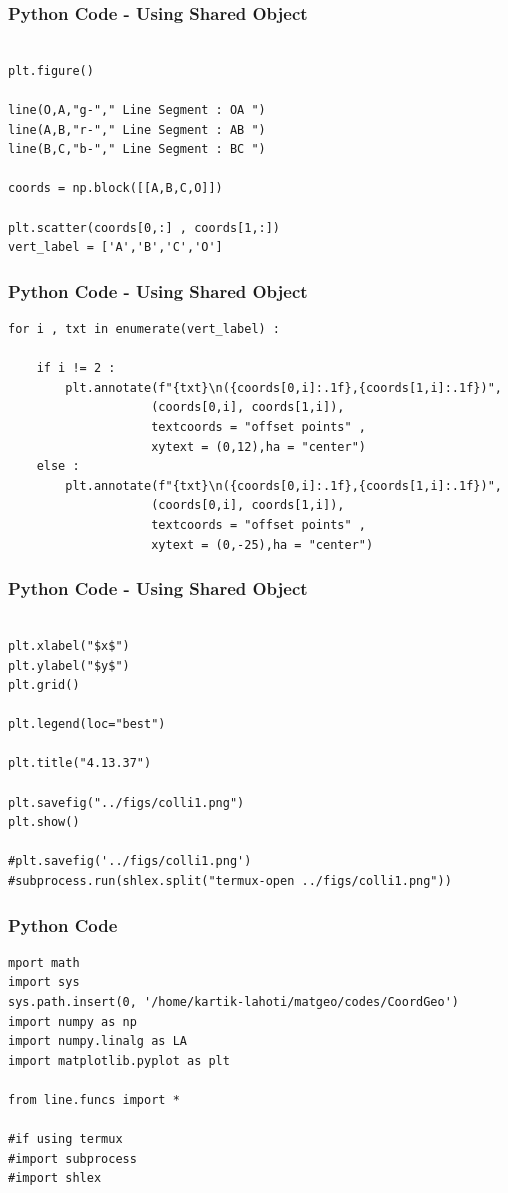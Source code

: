 \documentclass{beamer}
\begin{document}
\begin{frame}[fragile]
    \frametitle{Python Code - Using Shared Object}
    \begin{lstlisting}
    
plt.figure()

line(O,A,"g-"," Line Segment : OA ")
line(A,B,"r-"," Line Segment : AB ")
line(B,C,"b-"," Line Segment : BC ")

coords = np.block([[A,B,C,O]])

plt.scatter(coords[0,:] , coords[1,:])
vert_label = ['A','B','C','O']

\end{lstlisting}
\end{frame}
\begin{frame}[fragile]
    \frametitle{Python Code - Using Shared Object}
    \begin{lstlisting}
for i , txt in enumerate(vert_label) :
    
    if i != 2 :
        plt.annotate(f"{txt}\n({coords[0,i]:.1f},{coords[1,i]:.1f})",
                    (coords[0,i], coords[1,i]),
                    textcoords = "offset points" ,
                    xytext = (0,12),ha = "center")
    else :
        plt.annotate(f"{txt}\n({coords[0,i]:.1f},{coords[1,i]:.1f})",
                    (coords[0,i], coords[1,i]),
                    textcoords = "offset points" ,
                    xytext = (0,-25),ha = "center")
\end{lstlisting}
\end{frame}
\begin{frame}[fragile]
    \frametitle{Python Code - Using Shared Object}
    \begin{lstlisting}
    
plt.xlabel("$x$")
plt.ylabel("$y$")
plt.grid()

plt.legend(loc="best")

plt.title("4.13.37")

plt.savefig("../figs/colli1.png")
plt.show()

#plt.savefig('../figs/colli1.png')
#subprocess.run(shlex.split("termux-open ../figs/colli1.png"))

\end{lstlisting}
\end{frame}

\begin{frame}[fragile]
    \frametitle{Python Code}
    \begin{lstlisting}
mport math
import sys 
sys.path.insert(0, '/home/kartik-lahoti/matgeo/codes/CoordGeo')
import numpy as np
import numpy.linalg as LA
import matplotlib.pyplot as plt

from line.funcs import *

#if using termux
#import subprocess
#import shlex
\end{lstlisting}
\end{frame}
\end{document}
